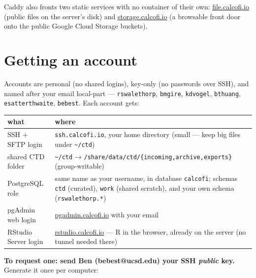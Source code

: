 \documentclass[
  letterpaper,
  DIV=11,
  numbers=noendperiod]{scrreprt}
\begin{document}
Caddy also fronts two static services with no container of their own:
\href{https://file.calcofi.io}{file.calcofi.io} (public files on the
server's disk) and \href{https://storage.calcofi.io}{storage.calcofi.io}
(a browsable front door onto the public Google Cloud Storage buckets).

\section{Getting an account}\label{sec-account}

Accounts are personal (no shared logins), key-only (no passwords over
SSH), and named after your email local-part --- \texttt{rswalethorp},
\texttt{bmgire}, \texttt{kdvogel}, \texttt{bthuang},
\texttt{esatterthwaite}, \texttt{bebest}. Each account gets:

\begin{longtable}[]{@{}
  >{\raggedright\arraybackslash}p{}
  >{\raggedright\arraybackslash}p{}@{}}
\toprule\noalign{}
\begin{minipage}[b]{\linewidth}\raggedright
what
\end{minipage} & \begin{minipage}[b]{\linewidth}\raggedright
where
\end{minipage} \\
\midrule\noalign{}
\endhead
\bottomrule\noalign{}
\endlastfoot
SSH + SFTP login & \texttt{ssh.calcofi.io}, your home directory (small
--- keep big files under \texttt{\textasciitilde{}/ctd}) \\
shared CTD folder & \texttt{\textasciitilde{}/ctd} →
\texttt{/share/data/ctd/\{incoming,archive,exports\}}
(group-writable) \\
PostgreSQL role & same name as your username, in database
\texttt{calcofi}; schemas \texttt{ctd} (curated), \texttt{work} (shared
scratch), and your own schema (\texttt{rswalethorp.*}) \\
pgAdmin web login &
\href{https://pgadmin.calcofi.io}{pgadmin.calcofi.io} with your email \\
RStudio Server login &
\href{https://rstudio.calcofi.io}{rstudio.calcofi.io} --- R in the
browser, already on the server (no tunnel needed there) \\
\end{longtable}

\textbf{To request one: send Ben (bebest@ucsd.edu) your SSH
\emph{public} key.} Generate it once per computer:
\end{document}
